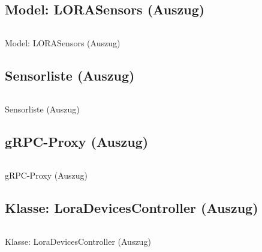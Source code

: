 \subsection{Model: LORASensors (Auszug)}
\label{app:Model}
\begin{longlisting}
  \inputminted{php}{Listings/model.php}
  \caption{Model: LORASensors (Auszug)}
\end{longlisting}
\clearpage


\clearpage

\subsection{Sensorliste (Auszug)}
\label{app:View}
\begin{longlisting}
  \inputminted{vue}{Listings/view.vue}
  \caption{Sensorliste (Auszug)}
\end{longlisting}

\subsection{gRPC-Proxy (Auszug)}
\label{app:Proxy}
\begin{longlisting}
  \inputminted{ts}{Listings/proxy.ts}
  \caption{gRPC-Proxy (Auszug)}
\end{longlisting}

\subsection{Klasse: LoraDevicesController (Auszug)}
\label{app:Controller}
\begin{longlisting}
  \inputminted{php}{Listings/controller.php}
  \caption{Klasse: LoraDevicesController (Auszug)}
\end{longlisting}
\clearpage


